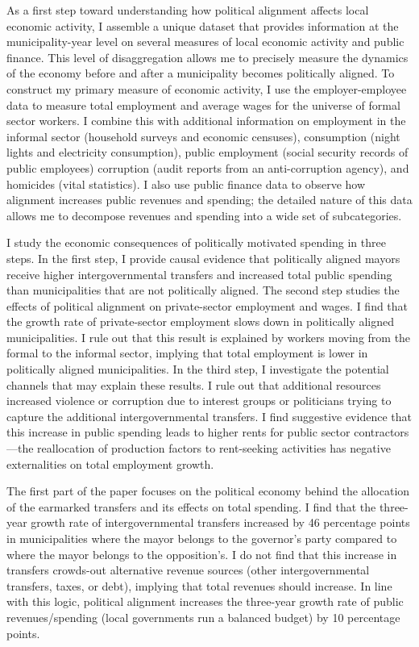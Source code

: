 \documentclass[dv_diss_main.tex]{subfiles}
\begin{document}
As a first step toward understanding how political alignment affects local economic activity, I assemble a unique dataset that provides information at the municipality-year level on several measures of local economic activity and public finance. This level of disaggregation allows me to precisely measure the dynamics of the economy before and after a municipality becomes politically aligned. To construct my primary measure of economic activity, I use the employer-employee data to measure total employment and average wages for the universe of formal sector workers. I combine this with additional information on employment in the informal sector (household surveys and economic censuses), consumption  (night lights and electricity consumption), public employment (social security records of public employees) corruption (audit reports from an anti-corruption agency), and homicides (vital statistics). I also use public finance data to observe how alignment increases public revenues and spending; the detailed nature of this data allows me to decompose  revenues and spending into a wide set of subcategories. 

I study the economic consequences of politically motivated spending in three steps. In the first step,  I provide causal evidence that politically aligned mayors receive higher intergovernmental transfers and increased total public spending than municipalities that are not politically aligned. The second step studies the effects of political alignment on private-sector employment and wages. I find that the growth rate of private-sector employment slows down in politically aligned municipalities. I rule out that this result is explained by workers moving from the formal to the informal sector, implying that total employment is lower in politically aligned municipalities. In the third step, I investigate the potential channels that may explain these results. I rule out that additional resources increased violence or corruption due to interest groups or politicians trying to capture the additional intergovernmental transfers. I find suggestive evidence that this increase in public spending leads to higher rents for public sector contractors—the reallocation of production factors to rent-seeking activities has negative externalities on total employment growth.


The first part of the paper focuses on the political economy behind the allocation of the earmarked transfers and its effects on total spending.
I find that the three-year growth rate of intergovernmental transfers increased by 46 percentage points in municipalities where the mayor belongs to the governor's party compared to where the mayor belongs to the opposition's. 
I do not find that this increase in transfers crowds-out alternative revenue sources (other intergovernmental transfers, taxes, or debt), implying that total revenues should increase.
In line with this logic, political alignment increases the three-year growth rate of public revenues/spending (local governments run a balanced budget) by 10 percentage points.
\end{document}
